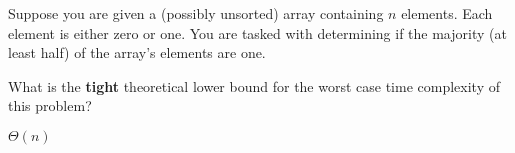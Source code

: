 \begin{prob}
    Suppose you are given a (possibly unsorted) array containing $n$ elements.
    Each element is either zero or one. You are tasked with determining if
    the majority (at least half) of the array's elements are one.

    What is the \textbf{tight} theoretical lower bound for the worst case time
    complexity of this problem?

    \begin{soln}
        $\Theta(n)$
    \end{soln}

\end{prob}

